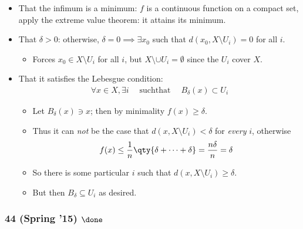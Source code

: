 \begin{solution}
\begin{itemize}
  \begin{itemize}
  \tightlist
  \item
    That the infimum is a minimum: \(f\) is a continuous function on a
    compact set, apply the extreme value theorem: it attains its
    minimum.
  \item
    That \(\delta > 0\): otherwise, \(\delta = 0 \implies \exists x_0\)
    such that \(d(x_0, X\setminus U_i) = 0\) for all \(i\).

    \begin{itemize}
    \tightlist
    \item
      Forces \(x_0 \in X\setminus U_i\) for all \(i\), but
      \(X\setminus \cup U_i = \emptyset\) since the \(U_i\) cover \(X\).
    \end{itemize}
  \item
    That it satisfies the Lebesgue condition:
    \begin{align*}\forall x\in X, \exists i {\quad \operatorname{such that} \quad} B_\delta(x) \subset U_i\end{align*}

    \begin{itemize}
    \tightlist
    \item
      Let \(B_\delta(x) \ni x\); then by minimality
      \(f(x) \geq \delta\).
    \item
      Thus it can \emph{not} be the case that
      \(d(x, X\setminus U_i) < \delta\) for \emph{every} \(i\),
      otherwise
      \begin{align*}f(x) \leq {1\over n}\qty{ \delta + \cdots + \delta} = {n\delta \over n} = \delta\end{align*}
    \item
      So there is some particular \(i\) such that
      \(d(x, X\setminus U_i) \geq \delta\).
    \item
      But then \(B_\delta \subseteq U_i\) as desired.
    \end{itemize}
  \end{itemize}
\end{itemize}

\end{solution}

\hypertarget{spring-15-done-1}{%
\subsubsection{\texorpdfstring{44 (Spring '15)
\(\done\)}{44 (Spring '15) \textbackslash done}}\label{spring-15-done-1}}

